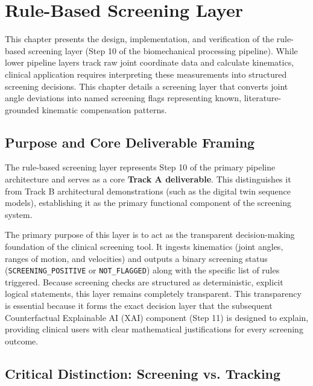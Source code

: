 \chapter{Rule-Based Screening Layer}
\label{ch:screening}



This chapter presents the design, implementation, and verification of the rule-based screening layer (Step 10 of the biomechanical processing pipeline). While lower pipeline layers track raw joint coordinate data and calculate kinematics, clinical application requires interpreting these measurements into structured screening decisions. This chapter details a screening layer that converts joint angle deviations into named screening flags representing known, literature-grounded kinematic compensation patterns.



\section{Purpose and Core Deliverable Framing}
\label{sec:10-1-purpose-and-core-deliverable-framing}


The rule-based screening layer represents Step 10 of the primary pipeline architecture and serves as a core \textbf{Track A deliverable}. This distinguishes it from Track B architectural demonstrations (such as the digital twin sequence models), establishing it as the primary functional component of the screening system.

The primary purpose of this layer is to act as the transparent decision-making foundation of the clinical screening tool. It ingests kinematics (joint angles, ranges of motion, and velocities) and outputs a binary screening status (\texttt{SCREENING\_POSITIVE} or \texttt{NOT\_FLAGGED}) along with the specific list of rules triggered. Because screening checks are structured as deterministic, explicit logical statements, this layer remains completely transparent. This transparency is essential because it forms the exact decision layer that the subsequent Counterfactual Explainable AI (XAI) component (Step 11) is designed to explain, providing clinical users with clear mathematical justifications for every screening outcome.



\section{Critical Distinction: Screening vs. Tracking}
\label{sec:10-2-critical-distinction-screening-vs-tracking}


